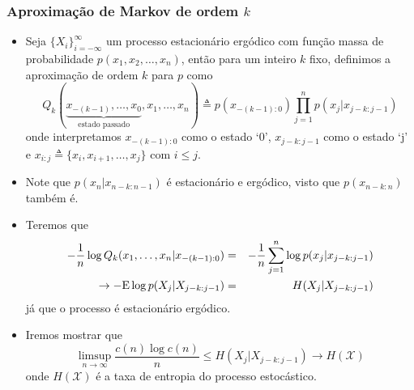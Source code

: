 \begin{frame}[allowframebreaks]
  \frametitle{Aproximação de Markov de ordem $k$}
  \begin{itemize}
  \item Seja $\{X_i\}_{i=-\infty}^{\infty}$ um processo estacionário ergódico com função
	massa de probabilidade $p(x_1, x_2, \ldots, x_n)$, então para um inteiro $k$ fixo,
	definimos a aproximação de ordem $k$ para $p$ como
	\begin{equation}
	Q_k( \underbrace{ x_{-(k-1)}, \ldots, x_0}_{\text{estado passado}}, x_1, \ldots, x_n  ) \triangleq p(x_{-(k-1):0}) \prod_{j=1}^{n} p(x_j | x_{j-k:j-1})
	\end{equation}
	onde interpretamos $x_{-(k-1):0}$ como o estado `0', $x_{j-k:j-1}$ como o estado `j' e 
	$x_{i:j} \triangleq \{x_i, x_{i+1}, \ldots, x_j \}$ com $i \leq j$.
  \item Note que $p(x_n | x_{n-k:n-1})$ é estacionário e ergódico, visto que $p(x_{n-k:n})$ também é.
  \item Teremos que
	\begin{eqnarray}
	- \frac{1}{n} \log Q_k(x_1,\ldots,x_n|x_{-(k-1):0}) &=& - \frac{1}{n} \sum_{j=1}^{n} \log p(x_j | x_{j-k:j-1}) \nonumber \\
	\rightarrow - \mathrm{E} \log p(X_j | X_{j-k:j-1}) &=& H(X_j | X_{j-k:j-1}) 
	\end{eqnarray}
	já que o processo é estacionário ergódico.
  \item Iremos mostrar que
	\begin{equation}
	\limsup_{n \rightarrow \infty} \frac{c(n) \log c(n)}{n} \leq H(X_j | X_{j-k : j-1}) \rightarrow H(\mathcal{X})
	\end{equation}
	onde $H(\mathcal{X})$ é a taxa de entropia do processo estocástico.
  \end{itemize}
\end{frame}

